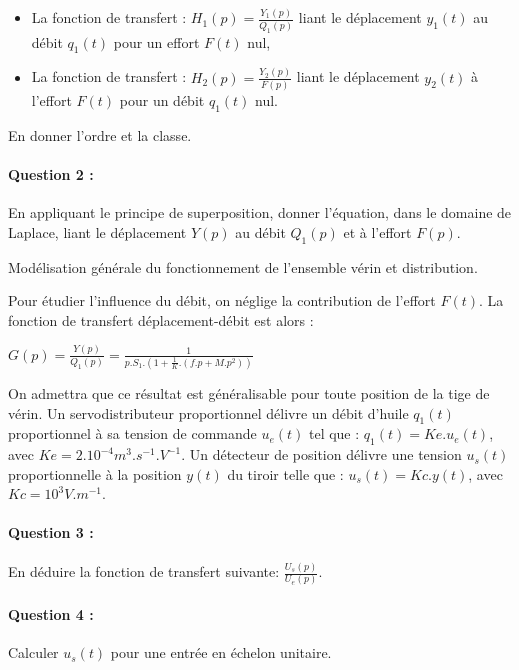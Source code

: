 \begin{itemize}
 \item La fonction de transfert : $H_1(p)=\frac{Y_1(p)}{Q_1(p)}$ liant le déplacement $y_1(t)$ au débit $q_1(t)$ pour un effort $F(t)$ nul, 
 \item La fonction de transfert : $H_2(p)=\frac{Y_2(p)}{F(p)}$ liant le déplacement $y_2(t)$ à l'effort $F(t)$ pour un débit $q_1(t)$ nul.
\end{itemize}
 
En donner l'ordre et la classe.

\paragraph{Question 2 :} En appliquant le principe de superposition, donner l'équation, dans le domaine de Laplace, liant le déplacement $Y(p)$ au débit $Q_1(p)$ et à l'effort $F(p)$.

Modélisation générale du fonctionnement de l'ensemble vérin et distribution. 

Pour étudier l'influence du débit, on néglige la contribution de l'effort $F(t)$. La fonction de transfert déplacement-débit est alors :

$G(p)=\frac{Y(p)}{Q_1(p)}=\frac{1}{p.S_1.(1+\frac{1}{K}.(f.p+M.p^2))}$

On admettra que ce résultat est généralisable pour toute position de la tige de vérin. Un servodistributeur proportionnel délivre un débit d'huile $q_1(t)$ proportionnel à sa tension de commande $u_e(t)$ tel que : $q_1(t)= Ke.u_e(t)$, avec $Ke=2.10^{-4} m^3.s^{-1}.V^{-1}$. Un détecteur de position délivre une tension $u_s(t)$ proportionnelle à la position $y(t)$ du tiroir telle que : $u_s(t)=Kc.y(t)$, avec $Kc= 10^3 V.m^{-1}$. 

\paragraph{Question 3 :} En déduire la fonction de transfert suivante: $\frac{U_s(p)}{U_e(p)}$.

\paragraph{Question 4 :} Calculer $u_s(t)$ pour une entrée en échelon unitaire.

